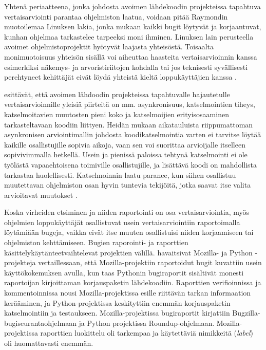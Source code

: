 \documentclass[utf8]{gradu3}
\begin{document}
Yhtenä periaatteena, jonka johdosta avoimen lähdekoodin projekteissa tapahtuva
vertaisarviointi parantaa ohjelmiston laatua, voidaan pitää Raymondin
\parencite*{Raymond-1999} muotoilemaa Linuksen lakia, jonka mukaan kaikki bugit
löytyvät ja korjaantuvat, kunhan ohjelmaa tarkastelee tarpeeksi moni ihminen.
Linuksen lain perusteella avoimet ohjelmistoprojektit hyötyvät laajasta
yhteisöstä. Toisaalta monimuotoisuus yhteisön sisällä voi aiheuttaa haasteita
vertaisarvioinnin kanssa esimerkiksi näkemys- ja arvoristiriitojen kohdalla tai
jos teknisesti syvällisesti perehtyneet kehittäjät eivät löydä yhteistä kieltä 
loppukäyttäjien kanssa \parencite{Wang-2015}. 

\textcite{Rigby-2012} esittävät, että avoimen lähdoodin projekteissa
tapahtuvalle hajautetulle vertaisarvioinnille yleisiä piirteitä on mm.
asynkronisuus, katselmointien tiheys, katselmoitavien muutosten pieni koko ja
katselmoijien erityisosaaminen tarkasteltavaan koodiin liittyen. Heidän mukaan
aikatauluista riippumattoman asynkronisen arviointimallin johdosta
koodikatselmointia varten ei tarvitse löytää kaikille osallistujille sopivia
aikoja, vaan sen voi suorittaa arvioijalle itselleen sopivivimmalla hetkellä.
Usein ja pienissä paloissa tehtynä katselmointi ei ole työlästä vapaaehtoisena
toimiville osallistujille, ja lisättävä koodi on mahdollista tarkastaa
huolellisesti. Katselmoinnin laatu paranee, kun siihen osallistuu muutettavan
ohjelmiston osan hyvin tuntevia tekijöitä, jotka saavat itse valita arvioitavat
muutokset \parencite{Rigby-2012, Rigby-2014}.

Koska virheiden etsiminen ja niiden raportointi on osa vertaisarviointia, myös
ohjelmien loppukäyttäjät osallistuvat usein vertaisarviointiin raportoimalla
löytämiään bugeja, vaikka eivät itse muuten osallistuisi niiden korjaamiseen tai
ohjelmiston kehttämiseen. Bugien raporointi- ja raporttien
käsittelykäytänteetvaihtelevat projektien välillä. \textcite{Wang-2015}
havaitsivat Mozilla- ja Python -projekteja vertaillessaan, että
Mozilla-projektiin raportoidut bugit kuvattiin usein käyttökokemuksen avulla,
kun taas Pythonin bugiraportit sisältivät monesti raportoijan kirjoittaman
korjauspaketin lähdekoodiin. Raporttien verifioinnissa ja kommentoinnissa nousi
Mozilla-projektissa esille riittävän tarkan informaation kerääminen, ja
Python-projektissa keskityttiin enemmän korjauspaketin katselmointiin ja
testaukseen. Mozilla-projektissa bugiraportit kirjattiin
Bugzilla-bugiseurantaohjelmaan ja Python projektissa Roundup-ohjelmaan.
Mozilla-projektissa raporttien luokittelu oli tarkempaa ja käytettäviä
nimikkeitä (\textit{label}) oli huomattavasti enemmän.
\parencite{Wang-2015}
\end{document}
